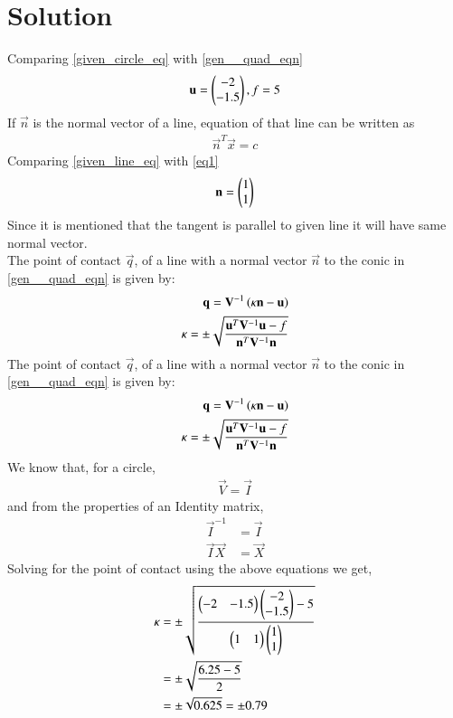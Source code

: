 \documentclass[journal,12pt,twocolumn]{IEEEtran}
\begin{document}
\section{Solution}

Comparing \eqref{given_circle_eq} with \eqref{gen__quad_eqn}
\begin{align}
\mathbf{u}=\begin{pmatrix}-2 \\ -1.5\end{pmatrix}, f=5
\end{align}
If $\vec{n}$ is the normal vector of a line, equation of that line can be written as 
\begin{align}
\vec{n}^T\vec{x} = c \label{eq1}
\end{align}
Comparing \eqref{given_line_eq} with \eqref{eq1}
\begin{align}
\mathbf{n} = \begin{pmatrix}1 \\ 1\end{pmatrix}\label{eq2}
\end{align}
Since it is mentioned that the tangent is parallel to given line it will have same normal vector. \\
 The point of contact $\vec{q}$, of a line with a normal vector $\vec{n}$ to the conic in \eqref{gen__quad_eqn} is given by:
\begin{align}
\mathbf{q} = \mathbf{V}^{-1}\left(\kappa \mathbf{n}-\mathbf{u}\right) \label{eq3} \\
\kappa = \pm \sqrt{\frac{\mathbf{u}^T\mathbf{V}^{-1}\mathbf{u}-f}{\mathbf{n}^T\mathbf{V}^{-1}\mathbf{n}}} \label{eq4}
\end{align}
The point of contact $\vec{q}$, of a line with a normal vector $\vec{n}$ to the conic in \eqref{gen__quad_eqn} is given by:
\begin{align}
\mathbf{q} = \mathbf{V}^{-1}\left(\kappa \mathbf{n}-\mathbf{u}\right) \label{eq3} \\
\kappa = \pm \sqrt{\frac{\mathbf{u}^T\mathbf{V}^{-1}\mathbf{u}-f}{\mathbf{n}^T\mathbf{V}^{-1}\mathbf{n}}} \label{eq4}
\end{align}
We know that, for a circle, 
\begin{align}
\vec{V} = \vec{I}  
\end{align}
and from the properties of an Identity matrix, 
\begin{align}
\vec{I}^{-1} &= \vec{I} \\
\vec{I}\vec{X} &= \vec{X}   
\end{align}
Solving for the point of contact using the above equations we get,
\begin{align}
\kappa &= \pm \sqrt{\frac{\begin{pmatrix} -2 & -1.5 \end{pmatrix}\begin{pmatrix}-2 \\ -1.5\end{pmatrix} - 5}{\begin{pmatrix}1 & 1 \end{pmatrix}\begin{pmatrix}1 \\ 1 \end{pmatrix}}} \\
&= \pm \sqrt{\frac{6.25 - 5}{2}} \\
& =  \pm \sqrt{0.625}=\pm 0.79 \\
\end{align}
\end{document}
